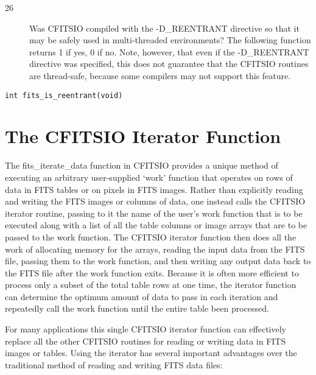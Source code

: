 \documentclass[11pt]{book}
\begin{document}
\begin{description}
\item[26]  Was CFITSIO compiled with the -D\_REENTRANT directive
so that it may be safely used in multi-threaded environments?
The following function returns 1 if yes, 0 if no.  Note, however,
that even if the -D\_REENTRANT directive was specified, this does
not guarantee that the CFITSIO routines are thread-safe, because
some compilers may not support this feature.\label{reentrant}
\end{description}

\begin{verbatim}
int fits_is_reentrant(void)
\end{verbatim}

\chapter{  The CFITSIO Iterator Function }

The fits\_iterate\_data function in CFITSIO provides a unique method of
executing an arbitrary user-supplied `work' function that operates on
rows of data in  FITS tables or on pixels in FITS images.  Rather than
explicitly reading and writing the FITS images or columns of data, one
instead calls the CFITSIO iterator routine, passing to it the name of
the user's work function that is to be executed along with a list of
all the table columns or image arrays that are to be passed to the work
function.  The CFITSIO iterator function then does all the work of
allocating memory for the arrays, reading the input data from the FITS
file, passing them to the work function, and then writing any output
data back to the FITS file after the work function exits.  Because
it is often more efficient to process only a subset of the total table
rows at one time, the iterator function can determine the optimum
amount of data to pass in each iteration and repeatedly call the work
function until the entire table been processed.

For many applications this single CFITSIO iterator function can
effectively replace all the other CFITSIO routines for reading or
writing data in FITS images or tables.  Using the iterator has several
important advantages over the traditional method of reading and writing
FITS data files:
\end{document}
